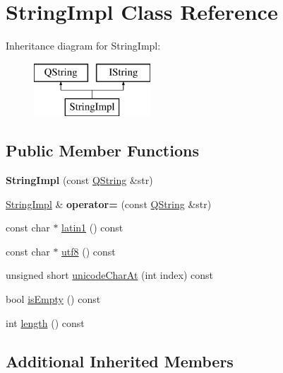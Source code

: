 \hypertarget{class_string_impl}{}\section{String\+Impl Class Reference}
\label{class_string_impl}
Inheritance diagram for String\+Impl\+:\begin{figure}[H]
\begin{center}
\leavevmode
\includegraphics[height=2.000000cm]{class_string_impl}
\end{center}
\end{figure}
\subsection*{Public Member Functions}
\begin{DoxyCompactItemize}
\item 
\mbox{\label{class_string_impl_a706bd009849da2787615fbd20d1494b1}} 
{\bfseries String\+Impl} (const \mbox{\hyperlink{class_q_string}{Q\+String}} \&str)
\item 
\mbox{\label{class_string_impl_a38a349596d9bd22b2dd14d2ea02edbc1}} 
\mbox{\hyperlink{class_string_impl}{String\+Impl}} \& {\bfseries operator=} (const \mbox{\hyperlink{class_q_string}{Q\+String}} \&str)
\item 
const char $\ast$ \mbox{\hyperlink{class_string_impl_a4a71f742026854a0941e7fa829b47203}{latin1}} () const
\item 
const char $\ast$ \mbox{\hyperlink{class_string_impl_a9e7c386a3cd20feb6dea3d98b559535c}{utf8}} () const
\item 
unsigned short \mbox{\hyperlink{class_string_impl_a002b2e0e2a91769a583437b6510ed409}{unicode\+Char\+At}} (int index) const
\item 
bool \mbox{\hyperlink{class_string_impl_a96cd2f042d397934171ebde8dd6f61ad}{is\+Empty}} () const
\item 
int \mbox{\hyperlink{class_string_impl_a52096f97ab17336a71a81e3c81e759ca}{length}} () const
\end{DoxyCompactItemize}
\subsection*{Additional Inherited Members}


